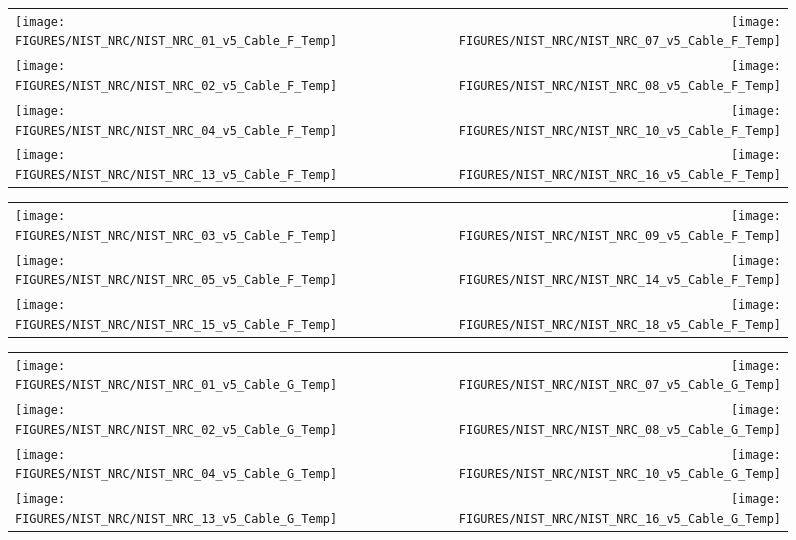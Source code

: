 \clearpage


\begin{figure}[h!]
\begin{tabular*}{\textwidth}{l@{\extracolsep{\fill}}r}
\texttt{[image: FIGURES/NIST\_NRC/NIST\_NRC\_01\_v5\_Cable\_F\_Temp]} &
\texttt{[image: FIGURES/NIST\_NRC/NIST\_NRC\_07\_v5\_Cable\_F\_Temp]} \\
\texttt{[image: FIGURES/NIST\_NRC/NIST\_NRC\_02\_v5\_Cable\_F\_Temp]} &
\texttt{[image: FIGURES/NIST\_NRC/NIST\_NRC\_08\_v5\_Cable\_F\_Temp]} \\
\texttt{[image: FIGURES/NIST\_NRC/NIST\_NRC\_04\_v5\_Cable\_F\_Temp]} &
\texttt{[image: FIGURES/NIST\_NRC/NIST\_NRC\_10\_v5\_Cable\_F\_Temp]} \\
\texttt{[image: FIGURES/NIST\_NRC/NIST\_NRC\_13\_v5\_Cable\_F\_Temp]} &
\texttt{[image: FIGURES/NIST\_NRC/NIST\_NRC\_16\_v5\_Cable\_F\_Temp]}
\end{tabular*}
\label{NIST_NRC_Cable_F_Closed}
\end{figure}

\clearpage

\begin{figure}[h!]
\begin{tabular*}{\textwidth}{l@{\extracolsep{\fill}}r}
\texttt{[image: FIGURES/NIST\_NRC/NIST\_NRC\_03\_v5\_Cable\_F\_Temp]} &
\texttt{[image: FIGURES/NIST\_NRC/NIST\_NRC\_09\_v5\_Cable\_F\_Temp]} \\
\texttt{[image: FIGURES/NIST\_NRC/NIST\_NRC\_05\_v5\_Cable\_F\_Temp]} &
\texttt{[image: FIGURES/NIST\_NRC/NIST\_NRC\_14\_v5\_Cable\_F\_Temp]} \\
\texttt{[image: FIGURES/NIST\_NRC/NIST\_NRC\_15\_v5\_Cable\_F\_Temp]} &
\texttt{[image: FIGURES/NIST\_NRC/NIST\_NRC\_18\_v5\_Cable\_F\_Temp]}
\end{tabular*}
\label{NIST_NRC_Cable_F_Open}
\end{figure}

\clearpage


\begin{figure}[h!]
\begin{tabular*}{\textwidth}{l@{\extracolsep{\fill}}r}
\texttt{[image: FIGURES/NIST\_NRC/NIST\_NRC\_01\_v5\_Cable\_G\_Temp]} &
\texttt{[image: FIGURES/NIST\_NRC/NIST\_NRC\_07\_v5\_Cable\_G\_Temp]} \\
\texttt{[image: FIGURES/NIST\_NRC/NIST\_NRC\_02\_v5\_Cable\_G\_Temp]} &
\texttt{[image: FIGURES/NIST\_NRC/NIST\_NRC\_08\_v5\_Cable\_G\_Temp]} \\
\texttt{[image: FIGURES/NIST\_NRC/NIST\_NRC\_04\_v5\_Cable\_G\_Temp]} &
\texttt{[image: FIGURES/NIST\_NRC/NIST\_NRC\_10\_v5\_Cable\_G\_Temp]} \\
\texttt{[image: FIGURES/NIST\_NRC/NIST\_NRC\_13\_v5\_Cable\_G\_Temp]} &
\texttt{[image: FIGURES/NIST\_NRC/NIST\_NRC\_16\_v5\_Cable\_G\_Temp]}
\end{tabular*}
\label{NIST_NRC_Cable_G_Closed}
\end{figure}

